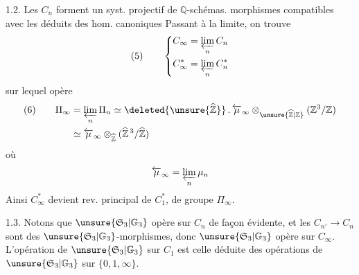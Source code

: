 1.2. Les $C_n$ forment un syst. projectif de $\mathbb Q$-schémas.
\diagram{\[
(4)\qquad\begin{tikzcd}[ampersand replacement=\&,column sep=large]
C_{n'}\arrow[r]\&C_n\\
(X^d,Y^d,\unsure{Z}^d)\&X,Y,Z\arrow[l]
\end{tikzcd}
\qquad\text{si }n\mid n'\quad\text{soit }n'=nd
\]}
morphismes compatibles avec les
déduits des hom. canoniques
Passant à la limite, on trouve
\[
(5)\qquad\left\{\begin{aligned}
C_\infty&=\varprojlim_n C_n\\
C_\infty^*&=\varprojlim_n C_n^*
\end{aligned}\right.
\]
sur lequel opère
\[
\begin{aligned}
(6)\qquad\Pi_\infty&=\varprojlim_n\Pi_n
\simeq\deleted{\unsure{\widehat{\mathbb Z}}}\, .\,\overleftarrow{\mu}_\infty
\otimes_{\unsure{\widehat{\mathbb Z}|\mathbb Z}}(\mathbb Z^3/\mathbb Z)\\
&\simeq\overleftarrow{\mu}_\infty\otimes_{\widehat{\mathbb Z}}
(\widehat{\mathbb Z}^{\,3}/\widehat{\mathbb Z})
\end{aligned}
\]
où
\[
\overleftarrow{\mu}_\infty=\varprojlim_n\mu_n
\]
Ainsi $C_\infty^*$ devient rev. principal de $C_1^*$, de groupe $\Pi_\infty$.

1.3. Notons que $\unsure{\mathfrak S_3|\mathbb G_3}$ opère sur $C_n$ de façon évidente,
et les $C_{n'}\longrightarrow C_n$ sont des $\unsure{\mathfrak S_3|\mathbb G_3}$-morphismes,
donc $\unsure{\mathfrak S_3|\mathbb G_3}$ opère sur $C_\infty$.
L'opération de $\unsure{\mathfrak S_3|\mathbb G_3}$ sur $C_1$ 
est celle déduite des opérations de $\unsure{\mathfrak S_3|\mathbb G_3}$ sur $\{0,1,\infty\}$.

